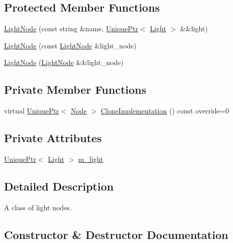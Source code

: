 \subsection*{Protected Member Functions}
\begin{DoxyCompactItemize}
\item 
\hyperlink{classmage_1_1_light_node_a4fea7bde70aebb6f9dc30e3374507c8a}{Light\+Node} (const string \&name, \hyperlink{namespacemage_a8c307fbcc33bce9b7f2aa4c26c3b95cf}{Unique\+Ptr}$<$ \hyperlink{classmage_1_1_light}{Light} $>$ \&\&light)
\item 
\hyperlink{classmage_1_1_light_node_afc1174329e2dbf2d349303fc396c3760}{Light\+Node} (const \hyperlink{classmage_1_1_light_node}{Light\+Node} \&light\+\_\+node)
\item 
\hyperlink{classmage_1_1_light_node_a0a2d5ee9e6417d73905d6f35116eccb3}{Light\+Node} (\hyperlink{classmage_1_1_light_node}{Light\+Node} \&\&light\+\_\+node)
\end{DoxyCompactItemize}
\subsection*{Private Member Functions}
\begin{DoxyCompactItemize}
\item 
virtual \hyperlink{namespacemage_a8c307fbcc33bce9b7f2aa4c26c3b95cf}{Unique\+Ptr}$<$ \hyperlink{classmage_1_1_node}{Node} $>$ \hyperlink{classmage_1_1_light_node_aea97601d0a4b8073a1c655ca334af242}{Clone\+Implementation} () const override=0
\end{DoxyCompactItemize}
\subsection*{Private Attributes}
\begin{DoxyCompactItemize}
\item 
\hyperlink{namespacemage_a8c307fbcc33bce9b7f2aa4c26c3b95cf}{Unique\+Ptr}$<$ \hyperlink{classmage_1_1_light}{Light} $>$ \hyperlink{classmage_1_1_light_node_aad97d01d2adb66eac0e93bdcdb919a05}{m\+\_\+light}
\end{DoxyCompactItemize}


\subsection{Detailed Description}
A class of light nodes. 

\subsection{Constructor \& Destructor Documentation}
\hypertarget{classmage_1_1_light_node_ad0c650ac0059589c28a3d1cfec95c07d}{}\label{classmage_1_1_light_node_ad0c650ac0059589c28a3d1cfec95c07d} 
